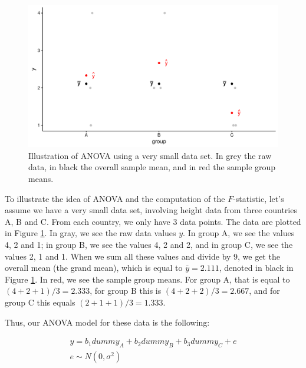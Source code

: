 \documentclass[]{book}\usepackage[]{graphicx}\usepackage[]{color}
\makeatletter
\def\maxwidth{ %
  \ifdim\Gin@nat@width>\linewidth
    \linewidth
  \else
    \Gin@nat@width
  \fi
}
\newenvironment{knitrout}{}{} %
\makeatother
\begin{document}
\begin{knitrout}
\color{fgcolor}\begin{figure}

{\centering \includegraphics[width=\maxwidth]{figure/example_anova-1} 

}

\caption[Illustration of ANOVA using a very small data set]{Illustration of ANOVA using a very small data set. In grey the raw data, in black the overall sample mean, and in red the sample group means.}\label{fig:example_anova}
\end{figure}


\end{knitrout}

To illustrate the idea of ANOVA and the computation of the $F$-statistic, let's assume we have a very small data set, involving height data from three countries A, B and C. From each country, we only have 3 data points. The data are plotted in Figure \ref{fig:example_anova}. In gray, we see the raw data values $y$. In group A, we see the values 4, 2 and 1; in group B, we see the values 4, 2 and 2, and in group C, we see the values 2, 1 and 1. When we sum all these values and divide by 9, we get the overall mean (the grand mean), which is equal to $\bar{y} = 2.111$, denoted in black in Figure \ref{fig:example_anova}. In red, we see the sample group means. For group A, that is equal to $(4 + 2 +1)/3=2.333 $, for group B this is $(4 + 2 + 2)/3=2.667 $, and for group C this equals $(2 + 1 +1)/3=1.333 $.

Thus, our ANOVA model for these data is the following:

\begin{eqnarray}
y = b_1 dummy_A + b_2 dummy_B + b_3 dummy_C + e\\
e \sim N(0, \sigma^2)
\end{eqnarray}
\end{document}
